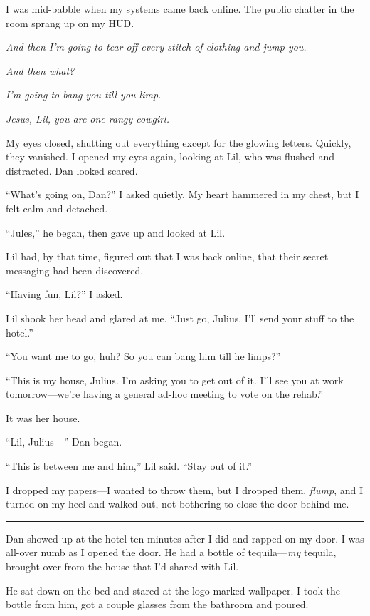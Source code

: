 I was mid-babble when my systems came back online. The public
chatter in the room sprang up on my HUD.

\emph{And then I'm going to tear off every stitch of clothing and jump you.}

\emph{And then what?}

\emph{I'm going to bang you till you limp.}

\emph{Jesus, Lil, you are one rangy cowgirl.}

My eyes closed, shutting out everything except for the glowing
letters. Quickly, they vanished. I opened my eyes again, looking at
Lil, who was flushed and distracted. Dan looked scared.

“What's going on, Dan?” I asked quietly. My heart hammered in my
chest, but I felt calm and detached.

“Jules,” he began, then gave up and looked at Lil.

Lil had, by that time, figured out that I was back online, that
their secret messaging had been discovered.

“Having fun, Lil?” I asked.

Lil shook her head and glared at me. “Just go, Julius. I'll send
your stuff to the hotel.”

“You want me to go, huh? So you can bang him till he limps?”

“This is my house, Julius. I'm asking you to get out of it. I'll
see you at work tomorrow—we're having a general ad-hoc meeting to
vote on the rehab.”

It was her house.

“Lil, Julius—” Dan began.

“This is between me and him,” Lil said. “Stay out of it.”

I dropped my papers—I wanted to throw them, but I dropped them,
\emph{flump}, and I turned on my heel and walked out, not bothering
to close the door behind me.

\begin{center}\rule{3in}{0.4pt}\end{center}

Dan showed up at the hotel ten minutes after I did and rapped on my
door. I was all-over numb as I opened the door. He had a bottle of
tequila—\emph{my} tequila, brought over from the house that I'd
shared with Lil.

He sat down on the bed and stared at the logo-marked wallpaper. I
took the bottle from him, got a couple glasses from the bathroom
and poured.

